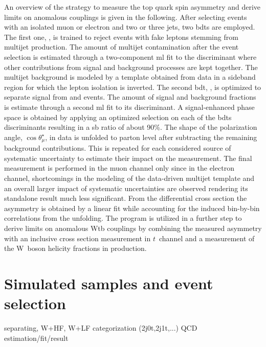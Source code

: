 An overview of the strategy to measure the top quark spin asymmetry and derive limits on anomalous couplings is given in the following. After selecting events with an isolated muon or electron and two or three jets, two \glspl{bdt} are employed. The first one, \bdtqcd, is trained to reject events with fake leptons stemming from multijet production. The amount of multijet contamination after the event selection is estimated through a two-component \gls{ml} fit to the \bdtqcd discriminant where other contributions from signal and background processes are kept together. The multijet background is modeled by a template obtained from data in a sideband region for which the lepton isolation is inverted. The second \gls{bdt}, \bdttch, is optimized to separate signal from \wjets and \ttbar events. The amount of signal and background fractions is estimate through a second \gls{ml} fit to its discriminant. A signal-enhanced phase space is obtained by applying an optimized selection on each of the \glspl{bdt} discriminants resulting in a \gls{sb} ratio of about 90\%. The shape of the polarization angle, $\cos\theta^\star_{\mu}$, in data is unfolded to parton level after subtracting the remaining background contributions. This is repeated for each considered source of systematic uncertainty to estimate their impact on the measurement. The final measurement is performed in the muon channel only since in the electron channel, shortcomings in the modeling of the data-driven multijet template and an overall larger impact of systematic uncertainties are observed rendering its standalone result much less significant. From the differential cross section the asymmetry is obtained by a linear fit while accounting for the induced bin-by-bin correlations from the unfolding. The \TOPFIT program is utilized in a further step to derive limits on anomalous Wtb couplings by combining the measured asymmetry with an inclusive cross section measurement in $t$~channel and a measurement of the W~boson helicity fractions in \ttbar production.





\section{Simulated samples and event selection}

separating, W+HF, W+LF
categorization (2j0t,2j1t,...)
QCD estimation/fit/result


